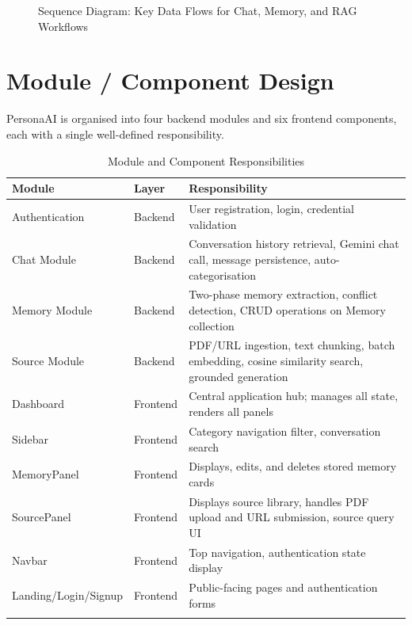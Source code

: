 \documentclass[12pt,a4paper]{report}
\begin{document}
\begin{figure}[H]
\caption{Sequence Diagram: Key Data Flows for Chat, Memory, and RAG Workflows}
\label{fig:dataflow}
\end{figure}

\section{Module / Component Design}

PersonaAI is organised into four backend modules and six frontend components, each with a single well-defined responsibility.

\begin{longtable}{@{}p{3.5cm} p{2cm} p{8cm}@{}}
\toprule
\textbf{Module} & \textbf{Layer} & \textbf{Responsibility} \\
\midrule
\endhead
Authentication & Backend & User registration, login, credential validation \\
Chat Module & Backend & Conversation history retrieval, Gemini chat call, message persistence, auto-categorisation \\
Memory Module & Backend & Two-phase memory extraction, conflict detection, CRUD operations on Memory collection \\
Source Module & Backend & PDF/URL ingestion, text chunking, batch embedding, cosine similarity search, grounded generation \\
\midrule
Dashboard & Frontend & Central application hub; manages all state, renders all panels \\
Sidebar & Frontend & Category navigation filter, conversation search \\
MemoryPanel & Frontend & Displays, edits, and deletes stored memory cards \\
SourcePanel & Frontend & Displays source library, handles PDF upload and URL submission, source query UI \\
Navbar & Frontend & Top navigation, authentication state display \\
Landing/Login/Signup & Frontend & Public-facing pages and authentication forms \\
\bottomrule
\caption{Module and Component Responsibilities}
\end{longtable}
\end{document}
